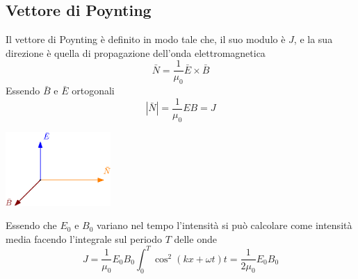 \documentclass[10pt, letterpaper]{report}
\begin{document}
\subsection{Vettore di Poynting}
Il vettore di Poynting è definito in modo tale che, il suo modulo è $J$, e la sua direzione è quella di propagazione dell'onda elettromagnetica 
$$\bar N = \frac{1}{\mu_0}\bar E \times \bar B $$
Essendo $\bar B $ e $\bar E$ ortogonali 
$$ |\bar N|=\frac{1}{\mu_0} E   B=J$$
\begin{center}
    \includegraphics[width=0.3\textwidth]{images/Poynting.eps}
\end{center}
Essendo che $E_0$ e $B_0$ variano nel tempo l'intensità si può calcolare come intensità media facendo l'integrale sul periodo $T$ delle onde 
$$ J=\frac{1}{\mu_0}E_0B_0\int_0^T\cos^2(kx+\omega t)t=\frac{1}{2\mu_0}E_0B_0$$
\end{document}
